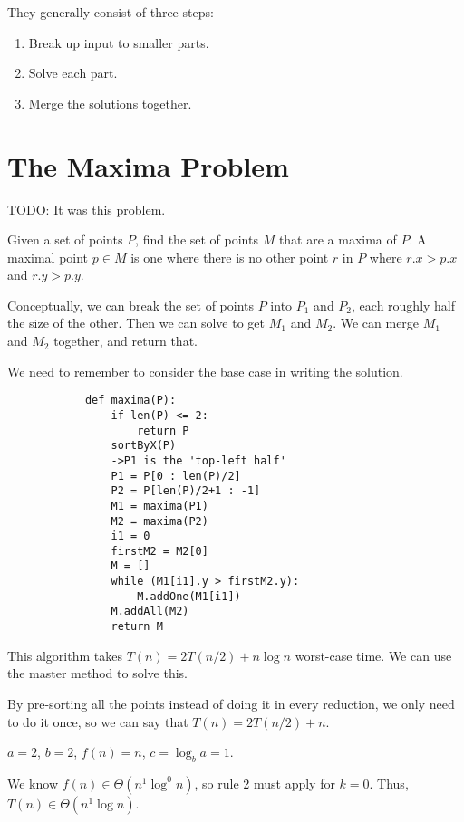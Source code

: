     They generally consist of three steps:
    \begin{enumerate}
        \item Break up input to smaller parts.
        \item Solve each part.
        \item Merge the solutions together.
    \end{enumerate}

    \section{The Maxima Problem}
        TODO: It was this problem.

        Given a set of points $P$, find the set of points $M$ that are a maxima
        of $P$.
        A maximal point $p \in M$ is one where there is no other point $r$ in
        $P$ where $r.x > p.x$ and $r.y > p.y$.

        Conceptually, we can break the set of points $P$ into $P_1$ and $P_2$,
        each roughly half the size of the other. Then we can solve to get $M_1$
        and $M_2$. We can merge $M_1$ and $M_2$ together, and return that.

        We need to remember to consider the base case in writing the solution.

        \begin{verbatim}
            def maxima(P):
                if len(P) <= 2:
                    return P
                sortByX(P)
                ->P1 is the 'top-left half'
                P1 = P[0 : len(P)/2]
                P2 = P[len(P)/2+1 : -1]
                M1 = maxima(P1)
                M2 = maxima(P2)
                i1 = 0
                firstM2 = M2[0]
                M = []
                while (M1[i1].y > firstM2.y):
                    M.addOne(M1[i1])
                M.addAll(M2)
                return M
        \end{verbatim}

        This algorithm takes $T(n) = 2T(n/2) + n\log n$ worst-case time. We can
        use the master method to solve this.

        By pre-sorting all the points instead of doing it in every reduction, we
        only need to do it once, so we can say that $T(n) = 2T(n/2) + n$.

        $a = 2$, $b = 2$, $f(n) = n$, $c = \log_b{a} = 1$.

        We know $f(n) \in \Theta(n^1 \log^0 n)$, so rule 2 must apply for
        $k = 0$. Thus, $T(n) \in \Theta(n^1 \log n)$.

